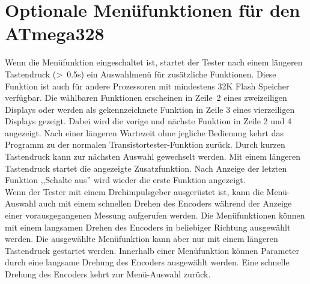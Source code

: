 \section{Optionale Menüfunktionen für den ATmega328}
Wenn die Menüfunktion eingeschaltet ist, startet der Tester nach einem längeren Tastendruck (\textgreater~0.5s) ein Auswahlmenü
für zusätzliche Funktionen.
Diese Funktion ist auch für andere Prozessoren mit mindestens 32K Flash Speicher verfügbar.
Die wählbaren Funktionen erscheinen in Zeile~2 eines zweizeiligen Displays oder werden als gekennzeichnete
Funktion in Zeile 3 eines vierzeiligen Displays gezeigt. Dabei wird die vorige und nächste Funktion in Zeile 2 und 4 angezeigt.
Nach einer längeren Wartezeit ohne jegliche Bedienung kehrt das Programm zu der normalen Transistortester-Funktion zurück.
Durch kurzen Tastendruck kann zur nächsten Auswahl gewechselt werden.
Mit einem längeren Tastendruck startet die angezeigte Zusatzfunktion.
Nach Anzeige der letzten Funktion ,,Schalte aus'' wird wieder die erste Funktion angezeigt.\\

Wenn der Tester mit einem Drehimpulsgeber ausgerüstet ist, kann die Menü-Auswahl auch mit einem schnellen
Drehen des Encoders während der Anzeige einer vorausgegangenen Messung aufgerufen werden.
Die Menüfunktionen können mit einem langsamen Drehen des Encoders in beliebiger Richtung ausgewählt werden.
Die ausgewählte Menüfunktion kann aber nur mit einem längeren Tastendruck gestartet werden.
Innerhalb einer Menüfunktion können Parameter durch eine langsame Drehung des Encoders ausgewählt werden.
Eine schnelle Drehung des Encoders kehrt zur Menü-Auswahl zurück.


